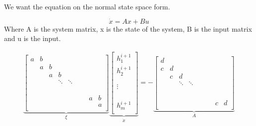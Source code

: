 We want the equation on the normal state space form.

\begin{equation}
	\dot{x} = Ax + Bu
\end{equation}
Where A is the system matrix, x is the state of the system, B is the input matrix and u is the input. 

\begin{equation}
\begin{aligned}
	   \underbrace{\begin{bmatrix}
	    	a & b \\
	    	  & a & b \\
	    	  &   & a & b  \\
	    	  &   &   & \ddots  & \ddots \\
	    	  &   &   &   &  &  \\
	    	  &   &   &   &  &  &  \\
	    	  &   &   &   &  &  &  &  \\
	    	  &   &   &   &  &  &  & a  &b\\
	    	  &   &   &   &  &  &  &  &  a\\
	   \end{bmatrix}}_{\xi}
	    \underbrace{\begin{bmatrix}
		h_{1}^{i+1} \\
		h_{2}^{i+1}\\
					\\
					\\
		\vdots		\\
					\\
					\\
					\\
		h_{m}^{i+1}\\
	\end{bmatrix}}_{\dot{x}}
	= -
	\underbrace{\begin{bmatrix}
	    	d &  \\
	    	c & d & \\
	    	  & c & d 		&   \\
	    	  &   &	\ddots   & \ddots  &  \\
	    	  &   &   &  	&  &  \\
	    	  &   &   &   &  &  &  \\
	    	  &   &   &   &  &  &  &  \\
	    	  &   &   &   &  &  &  &   &\\
	    	  &   &   &   &  &  &  & c &  d\\
	    \end{bmatrix}}_{A}

\end{aligned}
\end{equation}
